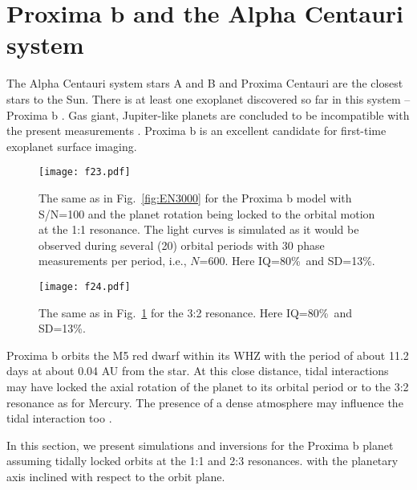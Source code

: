 \documentclass{emulateapj}
\begin{document}
\section{Proxima b and the Alpha Centauri system}\label{sec:acen}

The Alpha Centauri system stars A and B and Proxima Centauri are the closest stars
to the Sun. There is at least one exoplanet discovered so far
in this system -- Proxima b \citep{proxb}. Gas giant, Jupiter-like planets are
concluded to be incompatible with the present measurements \citep{acen_jup}.
Proxima b is an excellent candidate for first-time
exoplanet surface imaging. 

\begin{figure}
\centering
\texttt{[image: f23.pdf]}
\caption{The same as in Fig.~\ref{fig:EN3000} for the Proxima b model with S/N=100
and the planet rotation being locked to the orbital motion at the 1:1 resonance.
The light curves is simulated as it would be observed during several (20) orbital periods
with 30 phase measurements per period, i.e., $N$=600.
Here IQ=80\%\ and SD=13\%.}
\label{fig:prox11}
\end{figure}

\begin{figure}
\centering
\texttt{[image: f24.pdf]}
\caption{The same as in Fig.~\ref{fig:prox11} for the 3:2 resonance.
Here IQ=80\%\ and SD=13\%.}
\label{fig:prox32}
\end{figure}

Proxima b orbits the M5 red dwarf within its WHZ
with the period of about 11.2 days at about 0.04 AU from the star. 
At this close distance, tidal interactions may have locked the axial
rotation of the planet to its orbital period or to the 3:2 resonance as 
for Mercury. The presence of a dense atmosphere may
influence the tidal interaction too \citep{prox_atm}. 

In this section, we present simulations and inversions for the Proxima b
planet assuming tidally locked orbits at the 1:1 and 2:3 resonances.
with the planetary axis inclined with respect to the orbit plane.
\end{document}
